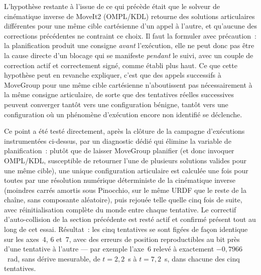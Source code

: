 \documentclass[a4paper, oneside]{article}
\begin{document}
L'hypothèse restante à l'issue de ce qui précède était que le solveur de
cinématique inverse de MoveIt2 (OMPL/KDL) retourne des solutions articulaires
différentes pour une même cible cartésienne d'un appel à l'autre, et
qu'aucune des corrections précédentes ne contraint ce choix. Il faut la
formuler avec précaution~: la planification produit une consigne
\emph{avant} l'exécution, elle ne peut donc pas être la cause directe d'un
blocage qui se manifeste \emph{pendant} le suivi, avec un couple de
correction actif et correctement signé, comme établi plus haut. Ce que cette
hypothèse peut en revanche expliquer, c'est que des appels successifs à
MoveGroup pour une même cible cartésienne n'aboutissent pas nécessairement à
la même consigne articulaire, de sorte que des tentatives réelles
successives peuvent converger tantôt vers une configuration bénigne, tantôt
vers une configuration où un phénomène d'exécution encore non identifié se
déclenche.

Ce point a été testé directement, après la clôture de la campagne
d'exécutions instrumentées ci-dessus, par un diagnostic dédié qui élimine la
variable de planification~: plutôt que de laisser MoveGroup planifier (et
donc invoquer OMPL/KDL, susceptible de retourner l'une de plusieurs solutions
valides pour une même cible), une unique configuration articulaire est
calculée une fois pour toutes par une résolution numérique déterministe de la
cinématique inverse (moindres carrés amortis sous Pinocchio, sur le même URDF
que le reste de la chaîne, sans composante aléatoire), puis rejouée telle
quelle cinq fois de suite, avec réinitialisation complète du monde entre
chaque tentative. Le correctif d'auto-collision de la section précédente est
resté actif et confirmé présent tout au long de cet essai. Résultat~: les
cinq tentatives se sont figées de façon identique sur les axes~4, 6 et~7,
avec des erreurs de position reproductibles au bit près d'une tentative à
l'autre — par exemple l'axe~6 relevé à exactement $-0{,}7966$~rad, sans
dérive mesurable, de $t=2{,}2$~s à $t=7{,}2$~s, dans chacune des cinq
tentatives.
\end{document}
